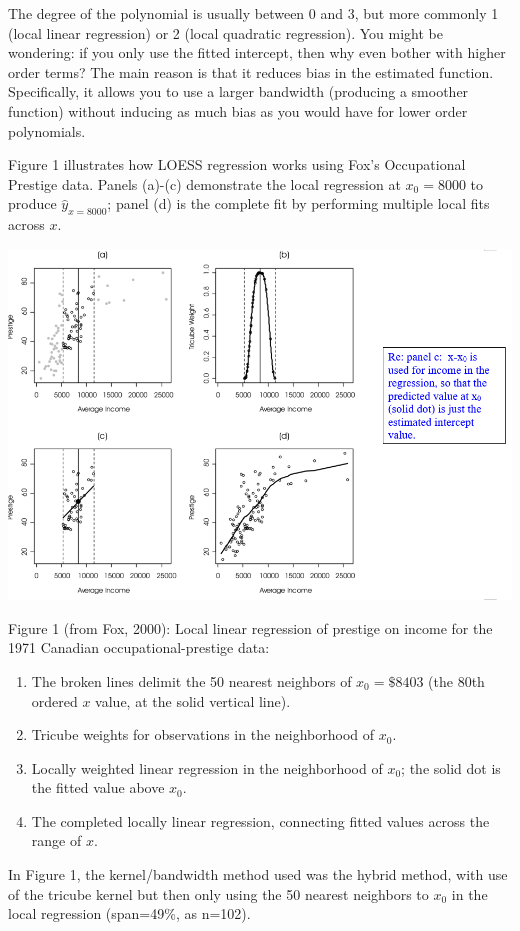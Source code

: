 \documentclass[
  9pt,
  ignorenonframetext,
]{beamer}
\providecommand{\tightlist}{%
  \setlength{\itemsep}{0pt}\setlength{\parskip}{0pt}}
\begin{document}
\begin{frame}{}
\protect\hypertarget{section-3}{}
The degree of the polynomial is usually between 0 and 3, but more
commonly 1 (local linear regression) or 2 (local quadratic regression).
You might be wondering: if you only use the fitted intercept, then why
even bother with higher order terms? The main reason is that it reduces
bias in the estimated function. Specifically, it allows you to use a
larger bandwidth (producing a smoother function) without inducing as
much bias as you would have for lower order polynomials.

Figure 1 illustrates how LOESS regression works using Fox's Occupational
Prestige data. Panels (a)-(c) demonstrate the local regression at
\(x_0=8000\) to produce \(\hat y_{x=8000}\); panel (d) is the complete
fit by performing multiple local fits across \(x\).
\end{frame}

\begin{frame}{}
\protect\hypertarget{section-4}{}
\begin{center}\includegraphics[width=0.5\linewidth]{figs_L21/f1} \end{center}
\end{frame}

\begin{frame}{}
\protect\hypertarget{section-5}{}
Figure 1 (from Fox, 2000): Local linear regression of prestige on income
for the 1971 Canadian occupational-prestige data:

\begin{enumerate}
\tightlist
\item
  The broken lines delimit the 50 nearest neighbors of \(x_0 = \$8403\)
  (the 80th ordered \(x\) value, at the solid vertical line).
\item
  Tricube weights for observations in the neighborhood of \(x_0\).
\item
  Locally weighted linear regression in the neighborhood of \(x_0\); the
  solid dot is the fitted value above \(x_0\).\\
\item
  The completed locally linear regression, connecting fitted values
  across the range of \(x\).
\end{enumerate}

In Figure 1, the kernel/bandwidth method used was the hybrid method,
with use of the tricube kernel but then only using the 50 nearest
neighbors to \(x_0\) in the local regression (span=49\%, as n=102).
\end{frame}
\end{document}
